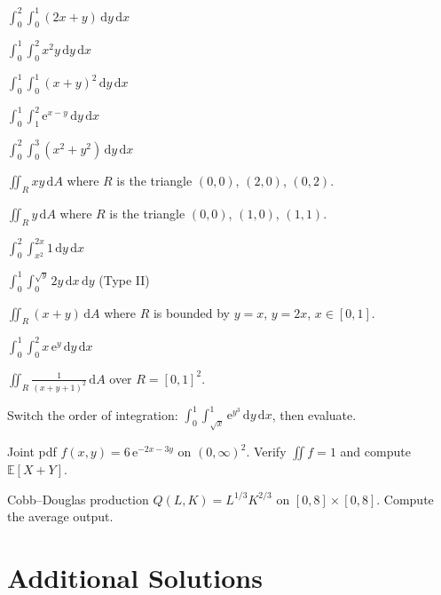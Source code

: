 \begin{problems}
  \item $\displaystyle\int_{0}^{2}\int_{0}^{1} (2x+y)\,\mathrm{d}y\,\mathrm{d}x$
  \item $\displaystyle\int_{0}^{1}\int_{0}^{2} x^{2}y\,\mathrm{d}y\,\mathrm{d}x$
  \item $\displaystyle\int_{0}^{1}\int_{0}^{1} (x+y)^{2}\,\mathrm{d}y\,\mathrm{d}x$
  \item $\displaystyle\int_{0}^{1}\int_{1}^{2} \mathrm{e}^{x-y}\,\mathrm{d}y\,\mathrm{d}x$
  \item $\displaystyle\int_{0}^{2}\int_{0}^{3} (x^{2}+y^{2})\,\mathrm{d}y\,\mathrm{d}x$
  \item $\displaystyle\iint_{R} xy\,\mathrm{d}A$ where $R$ is the
        triangle $(0,0)$, $(2,0)$, $(0,2)$.
  \item $\displaystyle\iint_{R} y\,\mathrm{d}A$ where $R$ is the
        triangle $(0,0)$, $(1,0)$, $(1,1)$.
  \item $\displaystyle\int_{0}^{2}\int_{x^{2}}^{2x} 1\,\mathrm{d}y\,\mathrm{d}x$
  \item $\displaystyle\int_{0}^{1}\int_{0}^{\sqrt{y}} 2y\,\mathrm{d}x\,\mathrm{d}y$
        \quad (Type II)
  \item $\displaystyle\iint_{R} (x+y)\,\mathrm{d}A$ where $R$ is
        bounded by $y=x$, $y=2x$, $x\in[0,1]$.
  \item $\displaystyle\int_{0}^{1}\int_{0}^{2} x\,\mathrm{e}^{y}\,\mathrm{d}y\,\mathrm{d}x$
  \item $\displaystyle\iint_{R} \frac{1}{(x+y+1)^{2}}\,\mathrm{d}A$
        over $R=[0,1]^{2}$.
  \item Switch the order of integration:
        $\displaystyle\int_{0}^{1}\int_{\sqrt{x}}^{1} \mathrm{e}^{y^{3}}\,\mathrm{d}y\,\mathrm{d}x$,
        then evaluate.
  \item Joint pdf $f(x,y)=6\,\mathrm{e}^{-2x-3y}$ on $(0,\infty)^{2}$.
        Verify $\iint f=1$ and compute $\mathbb{E}[X+Y]$.
  \item Cobb--Douglas production $Q(L,K)=L^{1/3}K^{2/3}$ on
        $[0,8]\times[0,8]$. Compute the average output.
\end{problems}

\section{Additional Solutions}

